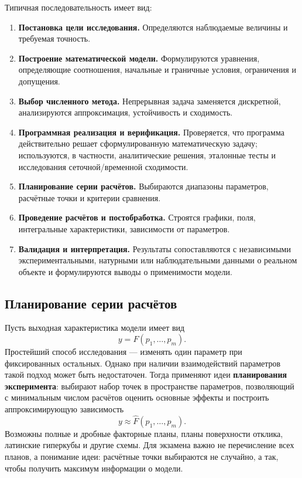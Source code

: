 Типичная последовательность имеет вид:
\begin{enumerate}
    \item \textbf{Постановка цели исследования.} Определяются наблюдаемые
    величины и требуемая точность.
    \item \textbf{Построение математической модели.} Формулируются
    уравнения, определяющие соотношения, начальные и граничные условия,
    ограничения и допущения.
    \item \textbf{Выбор численного метода.} Непрерывная задача заменяется
    дискретной, анализируются аппроксимация, устойчивость и сходимость.
    \item \textbf{Программная реализация и верификация.} Проверяется, что
    программа действительно решает сформулированную математическую задачу;
    используются, в частности, аналитические решения, эталонные тесты и
    исследования сеточной/временной сходимости.
    \item \textbf{Планирование серии расчётов.} Выбираются диапазоны
    параметров, расчётные точки и критерии сравнения.
    \item \textbf{Проведение расчётов и постобработка.} Строятся графики,
    поля, интегральные характеристики, зависимости от параметров.
    \item \textbf{Валидация и интерпретация.} Результаты сопоставляются с
    независимыми экспериментальными, натурными или наблюдательными данными о
    реальном объекте и формулируются выводы о применимости модели.
\end{enumerate}

\subsection{Планирование серии расчётов}

Пусть выходная характеристика модели имеет вид
\[
y=F(p_1,\ldots,p_m).
\]
Простейший способ исследования --- изменять один параметр при фиксированных
остальных. Однако при наличии взаимодействий параметров такой подход может
быть недостаточен. Тогда применяют идеи \textbf{планирования эксперимента}:
выбирают набор точек в пространстве параметров, позволяющий с минимальным
числом расчётов оценить основные эффекты и построить аппроксимирующую
зависимость
\[
y\approx\widehat F(p_1,\ldots,p_m).
\]
Возможны полные и дробные факторные планы, планы поверхности отклика,
латинские гиперкубы и другие схемы. Для экзамена важно не перечисление
всех планов, а понимание идеи: расчётные точки выбираются не случайно, а
так, чтобы получить максимум информации о модели.

